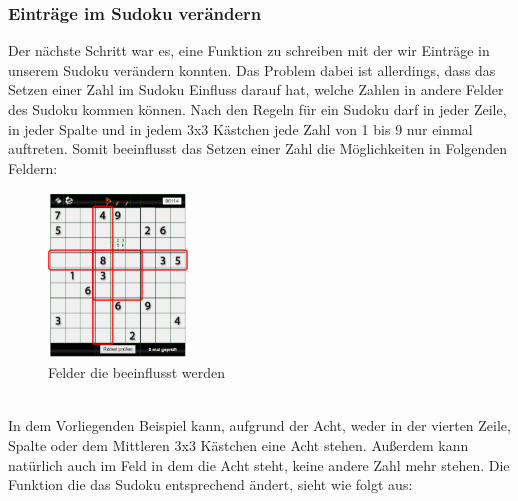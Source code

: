 \documentclass[11pt,a4paper]{article}
\begin{document}
\subsubsection{Einträge im Sudoku verändern}
Der nächste Schritt war es, eine Funktion zu schreiben mit der wir Einträge in unserem Sudoku verändern konnten. Das Problem dabei ist allerdings, dass das Setzen einer Zahl im Sudoku Einfluss darauf hat, welche Zahlen in andere Felder des Sudoku kommen können. Nach den Regeln für ein Sudoku darf in jeder Zeile, in jeder Spalte und in jedem 3x3 Kästchen jede Zahl von 1 bis 9 nur einmal auftreten. Somit beeinflusst das Setzen einer Zahl die Möglichkeiten in Folgenden Feldern:
\ \\
\begin{figure}[htbp!]
\begin{center}
\includegraphics[width=0.33\textwidth]{sudoku2.pdf}
\end{center}
\caption{Felder die beeinflusst werden}
\end{figure}
\ \\ 
In dem Vorliegenden Beispiel kann, aufgrund der Acht, weder in der vierten Zeile, Spalte oder dem Mittleren 3x3 Kästchen eine Acht stehen. Außerdem kann natürlich auch im Feld in dem die Acht steht, keine andere Zahl mehr stehen. Die Funktion die das Sudoku entsprechend ändert, sieht wie folgt aus:
\ \\
\end{document}
